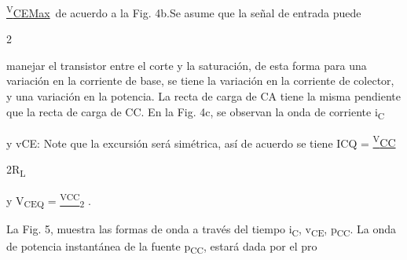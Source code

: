 \documentclass[12pt]{article}
\begin{document}
\begin{Center}
\uline{\textsuperscript{V}CEMax}\  de acuerdo a la Fig. \tabto{0.11in} 4b.\tab Se asume que la señal de entrada puede
\end{Center}\par

\begin{adjustwidth}{1.06in}{0.0in}
2\par

\end{adjustwidth}

\begin{adjustwidth}{0.86in}{0.88in}
\begin{justify}
{\fontsize{9pt}{10.8pt}\selectfont manejar el transistor entre el corte y la saturación, de esta forma para una variación en la corriente de base, se tiene la variación en la corriente de colector, y una variación en la potencia. La recta de carga de CA tiene la misma pendiente que la recta de carga de CC. En la Fig. 4c, se observan la onda de corriente i\textsubscript{C}\par}
\end{justify}\par

\end{adjustwidth}

\begin{adjustwidth}{0.86in}{0.0in}
y vCE: Note que la excursión será simétrica, así de acuerdo se tiene ICQ = \uline{\textsuperscript{V}CC}\par

\end{adjustwidth}

\begin{adjustwidth}{5.4in}{0.0in}
2R\textsubscript{L}\par

\end{adjustwidth}

\begin{adjustwidth}{0.86in}{0.0in}
y V\textsubscript{CEQ} = \uline{\textsuperscript{VCC}}\textsubscript{2} .\par

\end{adjustwidth}

\begin{adjustwidth}{1.07in}{0.88in}
{\fontsize{9pt}{10.8pt}\selectfont La Fig. 5, muestra las formas de onda a través del tiempo i\textsubscript{C}, v\textsubscript{CE}, p\textsubscript{CC}. La onda de potencia instantánea de la fuente p\textsubscript{CC}, estará dada por el pro\par}\par

\end{adjustwidth}
\end{document}
